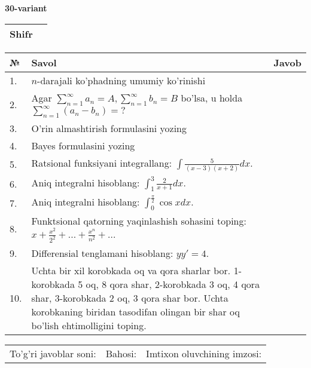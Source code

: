 \documentclass{article}
\begin{document}
  \egroup
  
  \newpage
  
  
  \textbf{30-variant}\\
  
  \bgroup
  \def\arraystretch{1.6} %
  
  \begin{tabular}{|m{5.7cm}|m{9.5cm}|}
  \hline
  Shifr & \\
  \hline
  \end{tabular}
  
  \vspace{1cm}
  
  \begin{tabular}{|m{0.7cm}|m{10cm}|m{4cm}|}
  \hline
  № & Savol & Javob \\
  \hline
  1. & \(n\)-darajali ko'phadning umumiy ko'rinishi &  \\
  \hline
  2. & Agar \(\sum_{n = 1}^{\infty}a_{n} = A,\sum_{n = 1}^{\infty}b_{n} = B\) bo'lsa, u holda \(\sum_{n = 1}^{\infty}\left( a_{n} - b_{n} \right) = ?\) &  \\
  \hline
  3. & O'rin almashtirish formulasini yozing &  \\
  \hline
  4. & Bayes formulasini yozing &  \\
  \hline
  5. & Ratsional funksiyani integrallang: \(\int {\frac{5}{(x - 3)(x + 2)}dx}\). &  \\
  \hline
  6. & Aniq integralni hisoblang: \(\int_{1}^{3}\frac{2}{x + 1}dx\). &  \\
  \hline
  7. & Aniq integralni hisoblang: \(\int_{0}^{\frac{\pi}{2}}{\cos xdx}\). &  \\
  \hline
  8. & Funktsional qatorning yaqinlashish sohasini toping: \(x + \frac{x^{2}}{2^{2}} + ... + \frac{x^{n}}{n^{2}} + ...\) &  \\
  \hline
  9. & Differensial tenglamani hisoblang: \(yy' = 4\). &  \\
  \hline
  10. & Uchta bir xil korobkada oq va qora sharlar bor. 1-korobkada 5 oq, 8 qora shar, 2-korobkada 3 oq, 4 qora shar, 3-korobkada 2 oq, 3 qora shar bor. Uchta korobkaning biridan tasodifan olingan bir shar oq bo'lish ehtimolligini toping. &  \\
  \hline
  \end{tabular}
  
  \vspace{1cm}
  
  \begin{tabular}{lll}
  To'g'ri javoblar soni: \underline{\hspace{1.5cm}} & 
  Bahosi: \underline{\hspace{1.5cm}} & 
  Imtixon oluvchining imzosi: \underline{\hspace{2cm}} \\
  \end{tabular}
  
\end{document}
